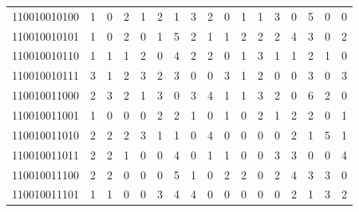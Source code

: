 \documentclass[10pt,a4paper]{article}
\begin{document}
\begin{longtable}{ |c|c|c|c|c|c|c|c|c|c|c|c|c|c|c|c|c| }
    110010010100              & 1                            & 0                                & 2                            & 1                              & 2   & 1   & 3   & 2   & 0   & 1   & 1   & 3   & 0   & 5   & 0   & 0   \\
    110010010101              & 1                            & 0                                & 2                            & 0                              & 1   & 5   & 2   & 1   & 1   & 2   & 2   & 2   & 4   & 3   & 0   & 2   \\
    110010010110              & 1                            & 1                                & 1                            & 2                              & 0   & 4   & 2   & 2   & 0   & 1   & 3   & 1   & 1   & 2   & 1   & 0   \\
    110010010111              & 3                            & 1                                & 2                            & 3                              & 2   & 3   & 0   & 0   & 3   & 1   & 2   & 0   & 0   & 3   & 0   & 3   \\
    110010011000              & 2                            & 3                                & 2                            & 1                              & 3   & 0   & 3   & 4   & 1   & 1   & 3   & 2   & 0   & 6   & 2   & 0   \\
    110010011001              & 1                            & 0                                & 0                            & 0                              & 2   & 2   & 1   & 0   & 1   & 0   & 2   & 1   & 2   & 2   & 0   & 1   \\
    110010011010              & 2                            & 2                                & 2                            & 3                              & 1   & 1   & 0   & 4   & 0   & 0   & 0   & 0   & 2   & 1   & 5   & 1   \\
    110010011011              & 2                            & 2                                & 1                            & 0                              & 0   & 4   & 0   & 1   & 1   & 0   & 0   & 3   & 3   & 0   & 0   & 4   \\
    110010011100              & 2                            & 2                                & 0                            & 0                              & 0   & 5   & 1   & 0   & 2   & 2   & 0   & 2   & 4   & 3   & 3   & 0   \\
    110010011101              & 1                            & 1                                & 0                            & 0                              & 3   & 4   & 4   & 0   & 0   & 0   & 0   & 0   & 2   & 1   & 3   & 2   \\

\end{longtable}
\end{document}
